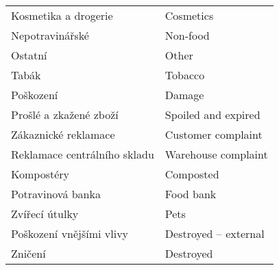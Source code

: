 \documentclass[a4paper,oneside,12pt]{book}
\begin{document}
\begin{longtable}[h!]{lp{8cm}}
  Kosmetika a drogerie &  Cosmetics \\
  Nepotravinářské & Non-food \\
  Ostatní & Other \\
  Tabák & Tobacco \\
  Poškození               &  Damage  \\
                Prošlé a zkažené zboží  &   Spoiled and expired   \\
                Zákaznické reklamace   &  Customer complaint \\
                Reklamace  centrálního skladu    &  Warehouse complaint  \\
                Kompostéry              &   Composted \\
                Potravinová banka       &  Food bank   \\
                Zvířecí útulky          &   Pets     \\
                Poškození vnějšími  vlivy    & Destroyed -- external \\
                Zničení & Destroyed \\
\end{longtable}
%
\end{document}
